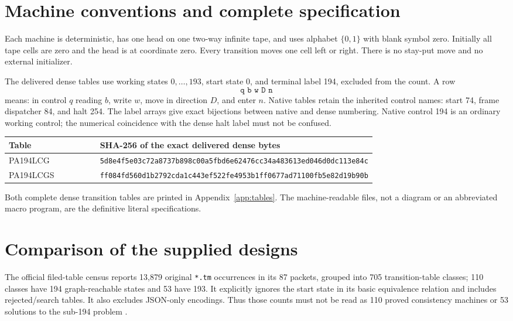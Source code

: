 \documentclass[11pt,letterpaper]{article}
\newcommand{\file}[1]{\nolinkurl{#1}}
\begin{document}
\section{Machine conventions and complete specification}
Each machine is deterministic, has one head on one two-way infinite tape,
and uses alphabet $\{0,1\}$ with blank symbol zero. Initially all tape cells
are zero and the head is at coordinate zero. Every transition moves one
cell left or right. There is no stay-put move and no external initializer.

The delivered dense tables use working states $0,\ldots,193$, start state
0, and terminal label 194, excluded from the count. A row
\[
\texttt{q\ b\ w\ D\ n}
\]
means: in control $q$ reading $b$, write $w$, move in direction $D$, and
enter $n$. Native tables retain the inherited control names: start 74,
frame dispatcher 84, and halt 254. The label arrays give exact bijections
between native and dense numbering. Native control 194 is an ordinary
working control; the numerical coincidence with the dense halt label
must not be confused.

\begin{center}\small
\begin{tabular}{lp{0.73\linewidth}}
\toprule
Table & SHA-256 of the exact delivered dense bytes\\
\midrule
PA194LCG & \nolinkurl{5d8e4f5e03c72a8737b898c00a5fbd6e62476cc34a483613ed046d0dc113e84c}\\
PA194LCGS & \nolinkurl{ff084fd560d1b2792cda1c443ef522fe4953b1ff0677ad71100fb5e82d19b90b}\\
\bottomrule
\end{tabular}
\end{center}
Both complete dense transition tables are printed in Appendix~\ref{app:tables}.
The machine-readable files, not a diagram or an abbreviated macro program,
are the definitive literal specifications.

\section{Comparison of the supplied designs}
\label{sec:comparison}
The official filed-table census reports 13,879 original \file{*.tm}
occurrences in its 87 packets, grouped into 705 transition-table classes;
110 classes have 194 graph-reachable states and 53 have 193. It explicitly
ignores the start state in its basic equivalence relation and includes
rejected/search tables. It also excludes JSON-only encodings. Thus those
counts must not be read as 110 proved consistency machines or 53 solutions
to the sub-194 problem \cite{machine-census}.
\end{document}
